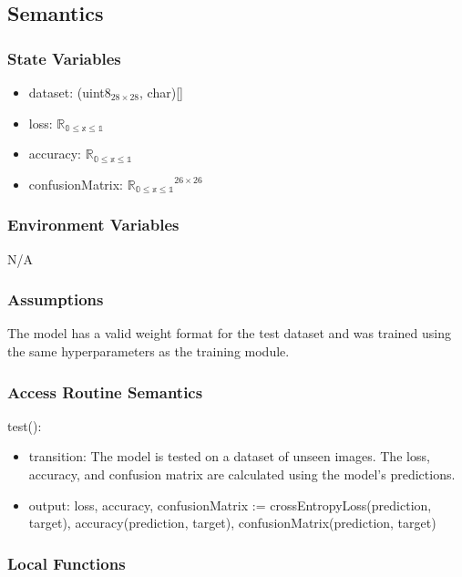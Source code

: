 \documentclass[12pt, titlepage]{article}
\begin{document}
\subsection{Semantics}

\subsubsection{State Variables}

\begin{itemize}
  \item dataset: (uint8$_{28 \times 28}$, char)[]
  \item loss: $\mathbb{R_{\text{0} \leq \text{x} \leq \text{1}}}$
  \item accuracy: $\mathbb{R_{\text{0} \leq \text{x} \leq \text{1}}}$
  \item confusionMatrix: $\mathbb{R_{\text{0} \leq \text{x} \leq \text{1}}}^{26 \times 26}$
\end{itemize}

\subsubsection{Environment Variables}

N/A

\subsubsection{Assumptions}

The model has a valid weight format for the test dataset and was trained using
the same hyperparameters as the training module.

\subsubsection{Access Routine Semantics}

\noindent test():
\begin{itemize}
\item transition: The model is tested on a dataset of unseen images. The loss,
accuracy, and confusion matrix are calculated using the model's predictions.
\item output: loss, accuracy, confusionMatrix := crossEntropyLoss(prediction,
target), accuracy(prediction, target), confusionMatrix(prediction, target)
\end{itemize}

\subsubsection{Local Functions}
\end{document}
